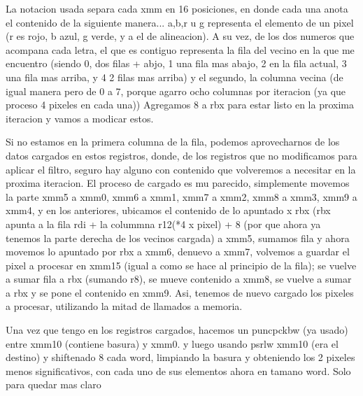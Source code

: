 \documentclass[a4paper]{article}
\begin{document}
La notacion usada separa cada xmm en 16 posiciones, en donde cada una anota el contenido de la siguiente manera... a,b,r u g representa el elemento de un pixel (r es rojo, b azul, g verde, y a el de alineacion). A su vez, de los dos numeros que acompana cada letra, el que es contiguo representa la fila del vecino en la que me encuentro (siendo 0, dos filas + abjo, 1 una fila mas abajo, 2 en la fila actual, 3 una fila mas arriba, y 4 2 filas mas arriba) y  el segundo, la columna vecina (de igual manera pero de 0 a 7, porque agarro ocho columnas por iteracion (ya que proceso 4 pixeles en cada una))
\hfill \break
	Agregamos 8 a rbx para estar listo en la proxima iteracion y vamos a modicar estos.\hfill \break
	
	Si no estamos en la primera columna de la fila, podemos aprovecharnos de los datos cargados en estos registros, donde, de los registros que no modificamos para aplicar el filtro, seguro hay alguno con contenido que volveremos a necesitar en la proxima iteracion. El proceso de cargado es mu parecido, simplemente movemos la parte  xmm5 a xmm0, xmm6 a xmm1, xmm7 a xmm2, xmm8 a xmm3, xmm9 a xmm4, y en los anteriores, ubicamos el contenido de lo apuntado x rbx \hfill \break
	(rbx apunta a la fila rdi + la colummna r12(*4 x pixel) + 8 (por que ahora ya tenemos la parte derecha de los vecinos cargada) a xmm5, sumamos fila y ahora movemos lo apuntado por rbx a xmm6, denuevo a xmm7, volvemos a guardar el pixel a procesar en xmm15 (igual a como se hace al principio de la fila); se vuelve a sumar fila a rbx (sumando r8), se mueve contenido a xmm8, se vuelve a sumar a rbx y se pone el contenido en xmm9.\hfill \break
	Asi, tenemos de nuevo cargado los pixeles a procesar, utilizando la mitad de llamados a memoria. \hfill \break
	
	Una vez que tengo en los registros cargados, hacemos un puncpckbw (ya usado) entre xmm10 (contiene basura) y xmm0. y luego usando psrlw xmm10 (era el destino) y shiftenado 8 cada word, limpiando la basura  y obteniendo los 2 pixeles menos significativos, con cada uno de sus elementos ahora en tamano word.\hfill \break
	Solo para quedar mas claro
	\hfill \break
	
\end{document}
